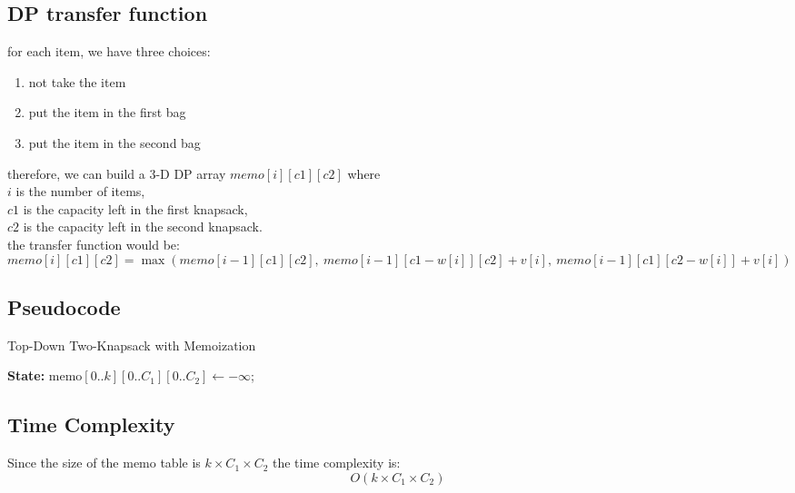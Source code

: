 \documentclass[a4paper,12pt]{article}
\begin{document}
\subsection{DP transfer function}
for each item, we have three choices:
\begin{enumerate}
    \item not take the item
    \item put the item in the first bag
    \item put the item in the second bag
\end{enumerate}
therefore, we can build a 3-D DP array $memo[i][c1][c2]$ where \\
$i$ is the number of items, \\
$c1$ is the capacity left in the first knapsack, \\
$c2$ is the capacity left in the second knapsack.\\
the transfer function would be:
\[
memo[i][c1][c2] = \max(memo[i-1][c1][c2],\ memo[i-1][c1-w[i]][c2] + v[i],\ memo[i-1][c1][c2-w[i]] + v[i])
\]
\subsection*{Pseudocode}
\begin{algorithm}[H]
\caption{Top-Down Two-Knapsack with Memoization}

\textbf{State:} $\text{memo}[0..k][0..C_1][0..C_2] \leftarrow -\infty$;

\;
\end{algorithm}


\subsection*{Time Complexity}
Since the size of the memo table is $k \times C_1 \times C_2$
the time complexity is:
\[O(k \times C_1 \times C_2)\]
\end{document}
